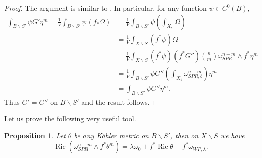 \documentclass[12pt]{article}
\newtheorem{proposition}[theorem]{Proposition}
\numberwithin{equation}{section}
\DeclareMathOperator{\Ric}{Ric}
\begin{document}
\begin{proof}
The argument is similar to \cite[Lem. 3.3]{ST12}. In particular, for any function $\psi \in C^{0}(B)$,
\begin{align*}
    \int_{B\backslash S'} \psi G' \eta^m = \frac{1}{V}\int_{B\backslash S'} \psi (f_*\Omega) &= \frac{1}{V}\int_{B\backslash S'} \psi \left(\int_{X_b}\Omega\right)\\
    &= \frac{1}{V}\int_{X\backslash S} (f^*\psi) \Omega\\
    &= \frac{1}{V} \int_{X\backslash S} (f^*\psi) (f^*G'') {n\choose m} \omega_{SPR}^{n-m} \wedge f^*\eta^m\\
    &= \frac{1}{V} \int_{B\backslash S'} \psi G'' \left(\int_{X_b}\omega_{SPR,b}^{n-m} \right) \eta^m\\
    &= \int_{B\backslash S'} \psi G'' \eta^m.
\end{align*}
Thus $G' = G''$ on $B \backslash S'$ and the result follows.
\end{proof}

\noindent Let us prove the following very useful tool.

\begin{proposition}\label{ric_of_fibration_volume_form}
Let $\theta$ be any K\"ahler metric on $B\backslash S'$, then on $X \backslash S$ we have
\begin{equation}
    \Ric (\omega_{SPR}^{n-m} \wedge f^* \theta^m) = \lambda \omega_0  +f^* \Ric \theta - f^* \omega_{WP,\lambda}.
\end{equation}
\end{proposition}
\end{document}
